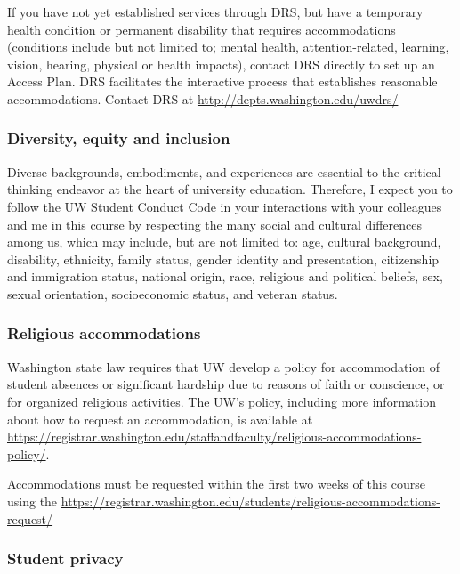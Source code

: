 \documentclass[
]{article}
\begin{document}
If you have not yet established services through DRS, but have a
temporary health condition or permanent disability that requires
accommodations (conditions include but not limited to; mental health,
attention-related, learning, vision, hearing, physical or health
impacts), contact DRS directly to set up an Access Plan. DRS facilitates
the interactive process that establishes reasonable accommodations.
Contact DRS at \url{http://depts.washington.edu/uwdrs/}

\hypertarget{diversity-equity-and-inclusion}{%
\subsubsection{Diversity, equity and
inclusion}\label{diversity-equity-and-inclusion}}

Diverse backgrounds, embodiments, and experiences are essential to the
critical thinking endeavor at the heart of university education.
Therefore, I expect you to follow the UW Student Conduct Code in your
interactions with your colleagues and me in this course by respecting
the many social and cultural differences among us, which may include,
but are not limited to: age, cultural background, disability, ethnicity,
family status, gender identity and presentation, citizenship and
immigration status, national origin, race, religious and political
beliefs, sex, sexual orientation, socioeconomic status, and veteran
status.

\hypertarget{religious-accommodations}{%
\subsubsection{Religious
accommodations}\label{religious-accommodations}}

Washington state law requires that UW develop a policy for accommodation
of student absences or significant hardship due to reasons of faith or
conscience, or for organized religious activities. The UW's policy,
including more information about how to request an accommodation, is
available at
\url{https://registrar.washington.edu/staffandfaculty/religious-accommodations-policy/}.

Accommodations must be requested within the first two weeks of this
course using the
\url{https://registrar.washington.edu/students/religious-accommodations-request/}

\hypertarget{student-privacy}{%
\subsubsection{Student privacy}\label{student-privacy}}
\end{document}
